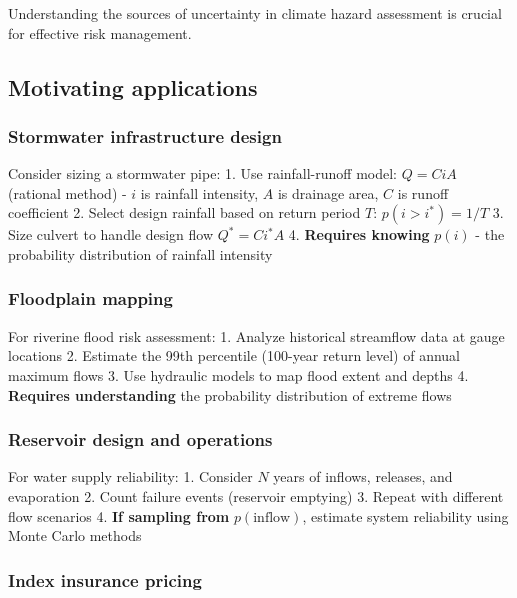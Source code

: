 \documentclass[
  letterpaper,
  DIV=11,
  numbers=noendperiod]{scrreprt}
\begin{document}
Understanding the sources of uncertainty in climate hazard assessment is
crucial for effective risk management.

\subsection{Motivating applications}\label{motivating-applications}

\subsubsection{Stormwater infrastructure
design}\label{stormwater-infrastructure-design}

Consider sizing a stormwater pipe: 1. Use rainfall-runoff model:
\(Q = CiA\) (rational method) - \(i\) is rainfall intensity, \(A\) is
drainage area, \(C\) is runoff coefficient 2. Select design rainfall
based on return period \(T\): \(p(i > i^*) = 1/T\) 3. Size culvert to
handle design flow \(Q^* = Ci^*A\) 4. \textbf{Requires knowing} \(p(i)\)
- the probability distribution of rainfall intensity

\subsubsection{Floodplain mapping}\label{floodplain-mapping}

For riverine flood risk assessment: 1. Analyze historical streamflow
data at gauge locations 2. Estimate the 99th percentile (100-year return
level) of annual maximum flows 3. Use hydraulic models to map flood
extent and depths 4. \textbf{Requires understanding} the probability
distribution of extreme flows

\subsubsection{Reservoir design and
operations}\label{reservoir-design-and-operations}

For water supply reliability: 1. Consider \(N\) years of inflows,
releases, and evaporation 2. Count failure events (reservoir emptying)
3. Repeat with different flow scenarios 4. \textbf{If sampling from}
\(p(\text{inflow})\), estimate system reliability using Monte Carlo
methods

\subsubsection{Index insurance pricing}\label{index-insurance-pricing}
\end{document}
